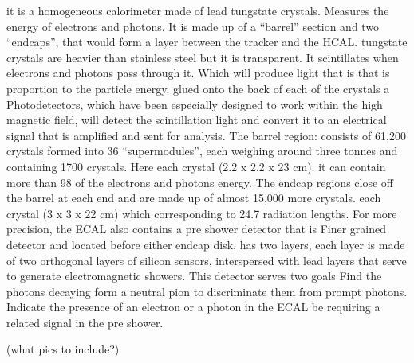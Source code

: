 it is a homogeneous calorimeter made of lead tungstate crystals. Measures the energy of electrons and photons. It is made up of a “barrel” section and two “endcaps”, that would form a layer between the tracker and the HCAL.
tungstate crystals are heavier than stainless steel but it is transparent. It scintillates when electrons and photons pass through it. Which will produce light that is that is proportion to the particle energy.
glued onto the back of each of the crystals a Photodetectors, which have been especially designed to work within the high magnetic field, will detect the scintillation light and convert it to an electrical signal that is amplified and sent for analysis.
The barrel region: consists of 61,200 crystals formed into 36 “supermodules”, each weighing around three tonnes and containing 1700 crystals. Here each crystal (2.2 x 2.2 x 23 cm). it can contain more than 98 of the electrons and photons energy.
The endcap regions close off the barrel at each end and are made up of almost 15,000 more crystals. each crystal (3 x 3 x 22 cm) which corresponding to 24.7 radiation lengths.
For more precision, the ECAL also contains a pre shower detector that is Finer grained detector and located before either endcap disk.  has two layers, each layer is made of two orthogonal layers of silicon sensors, interspersed with lead layers that serve to generate electromagnetic showers. This detector serves two goals Find the photons decaying form a neutral pion to discriminate them from prompt photons.  Indicate the presence of an electron or a photon in the ECAL be requiring a related signal in the pre shower.

(what pics to include?)

